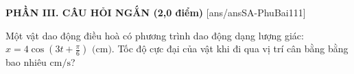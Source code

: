 
\noindent \textbf{PHẦN III. CÂU HỎI NGẮN (2,0 điểm)}
[ans/ansSA-PhuBai111]

\begin{ex}	Một vật dao động điều hoà có phương trình dao động dạng lượng giác: $x = 4 \cos\left(3t + \frac{\pi}{6}\right)\text{ (cm)}$. Tốc độ cực đại của vật khi đi qua vị trí cân bằng bằng bao nhiêu $\text{cm/s}$?

	\par{}
\end{ex}

